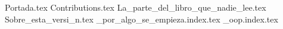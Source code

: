 {Portada.tex}
\tableofcontents
{Contributions.tex}
{La_parte_del_libro_que_nadie_lee.tex}
{Sobre_esta_versi_n.tex}
{_por_algo_se_empieza.index.tex}
{_oop.index.tex}
